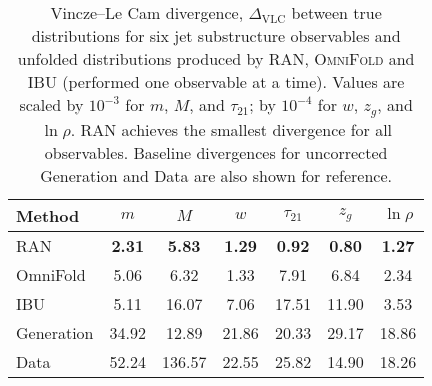 \begin{table}
    \centering
    \def\arraystretch{1.5}
    \begin{tabular}{lcccccc}
        \toprule
        Method & $m$ & $M$ & $w$ & $\tau_{21}$ & $z_g$ & $\ln\rho$ \\
        \midrule
        RAN      & \textbf{2.31} & \textbf{5.83} & \textbf{1.29} & \textbf{0.92} & \textbf{0.80} & \textbf{1.27} \\
        OmniFold & 5.06 & 6.32 & 1.33 & 7.91 & 6.84 & 2.34 \\
        IBU      & 5.11 & 16.07 & 7.06 & 17.51 & 11.90 & 3.53 \\
        \midrule
        Generation & 34.92 & 12.89 & 21.86 & 20.33 & 29.17 & 18.86 \\
        Data       & 52.24 & 136.57 & 22.55 & 25.82 & 14.90 & 18.26 \\
        \bottomrule
    \end{tabular}
    \caption[VLC divergence between unfolded and true distributions]{Vincze--Le Cam divergence, $\Delta_{\text{VLC}}$ between true distributions for six jet substructure observables and unfolded distributions produced by RAN, \textsc{OmniFold} and IBU (performed one observable at a time).
    Values are scaled by $10^{-3}$ for $m$, $M$, and $\tau_{21}$; by $10^{-4}$ for $w$, $z_g$, and $\ln\rho$. 
    RAN achieves the smallest divergence for all observables. 
    Baseline divergences for uncorrected Generation and Data are also shown for reference.}
    \label{tab:comp-vlc}
\end{table}